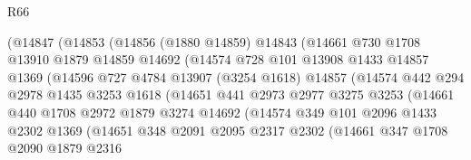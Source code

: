 \begin{lexlean}{R66}
\begin{coremodule}
                    (@14847
                      (@14853
                        (@14856
                          (@1880 @14859)
                          @14843
                          (@14661
                            @730
                            @1708
                            @13910
                            @1879
                            @14859
                            @14692
                            (@14574
                              @728
                              @101
                              @13908
                              @1433
                              @14857
                              @1369
                              (@14596
                                @727
                                @4784
                                @13907
                                (@3254 @1618)
                                @14857
                                (@14574
                                  @442
                                  @294
                                  @2978
                                  @1435
                                  @3253
                                  @1618
                                  (@14651
                                    @441
                                    @2973
                                    @2977
                                    @3275
                                    @3253
                                    (@14661
                                      @440
                                      @1708
                                      @2972
                                      @1879
                                      @3274
                                      @14692
                                      (@14574
                                        @349
                                        @101
                                        @2096
                                        @1433
                                        @2302
                                        @1369
                                        (@14651
                                          @348
                                          @2091
                                          @2095
                                          @2317
                                          @2302
                                          (@14661
                                            @347
                                            @1708
                                            @2090
                                            @1879
                                            @2316

\end{coremodule}
\end{lexlean}
